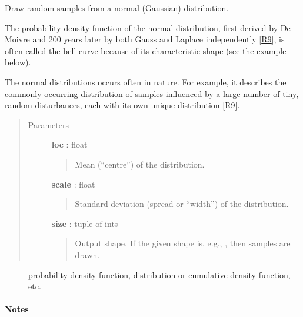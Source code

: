 \documentclass[letterpaper,10pt,english]{sphinxmanual}
\begin{document}
\begin{fulllineitems}
\label{index:halla.stats.normal}
Draw random samples from a normal (Gaussian) distribution.

The probability density function of the normal distribution, first
derived by De Moivre and 200 years later by both Gauss and Laplace
independently {\hyperref[index:r9]{{[}R9{]}}}, is often called the bell curve because of
its characteristic shape (see the example below).

The normal distributions occurs often in nature.  For example, it
describes the commonly occurring distribution of samples influenced
by a large number of tiny, random disturbances, each with its own
unique distribution {\hyperref[index:r9]{{[}R9{]}}}.
\begin{quote}\begin{description}
\item[{Parameters}] \leavevmode
\textbf{loc} : float
\begin{quote}

Mean (``centre'') of the distribution.
\end{quote}

\textbf{scale} : float
\begin{quote}

Standard deviation (spread or ``width'') of the distribution.
\end{quote}

\textbf{size} : tuple of ints
\begin{quote}

Output shape.  If the given shape is, e.g., , then
 samples are drawn.
\end{quote}

\end{description}\end{quote}



\begin{description}
\item[{}] \leavevmode
probability density function, distribution or cumulative density function, etc.

\end{description}


\paragraph{Notes}


\end{fulllineitems}
\end{document}
